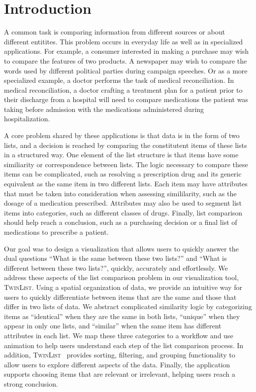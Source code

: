 \documentclass{chi2009}
\newcommand{\TwinList}{\textsc{TwinList}}
\begin{document}


\section{Introduction}
A common task is comparing information from different sources or about different entitites. This problem occurs in everyday life as well as in specialized applications. For example, a consumer interested in making a purchase may wish to compare the features of two products. A newspaper may wish to compare the words used by different political parties during campaign speeches. Or as a more specialized example, a doctor performs the task of medical reconciliation. In medical reconciliation, a doctor crafting a treatment plan for a patient prior to their discharge from a hospital will need to compare medications the patient was taking before admission with the medications administered during hospitalization. 

A core problem shared by these applications is that data is in the form of two lists, and a decision is reached by comparing the constitutent items of these lists in a structured way. One element of the list structure is that items have some similiarity or correspondence between lists. The logic necessary to compare these items can be complicated, such as resolving a prescription drug and its generic equivalent as the same item in two different lists. Each item may have attributes that must be taken into consideration when assessing simililarity, such as the dosage of a medication prescribed. Attributes may also be used to segment list items into categories, such as different classes of drugs. Finally, list comparison should help reach a conclusion, such as a purchasing decision or a final list of medications to prescribe a patient.

Our goal was to design a visualization that allows users to quickly answer the dual questions ``What is the same between these two lists?'' and ``What is different between these two lists?'', quickly, accurately and effortlessly. We address these aspects of the list comparison problem in our visualization tool, \TwinList. Using a spatial organization of data, we provide an intuitive way for users to quickly differentiate between items that are the same and those that differ in two lists of data. We abstract complicated similarity logic by categorizing items as ``identical'' when they are the same in both lists, ``unique'' when they appear in only one lists, and ``similar'' when the same item has different attributes in each list. We map these three categories to a workflow and use animation to help users understand each step of the list comparison process. In addition, \TwinList~ provides sorting, filtering, and grouping functionality to allow users to explore different aspects of the data. Finally, the application supports choosing items that are relevant or irrelevant, helping users reach a strong conclusion. 
\end{document}
